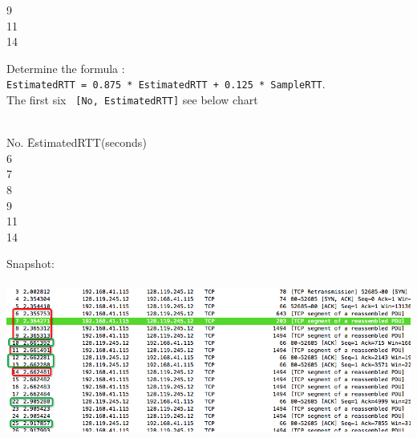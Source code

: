 \documentclass[a4paper]{article}
\begin{document}
{\begin{tabbing}
	 \hspace{4em}	9 	  \\
	 \hspace{4em}	11    \\
	 \hspace{4em}	14    \\
	\end{tabbing}
	Determine the formula :\\ \verb|EstimatedRTT = 0.875 * EstimatedRTT + 0.125 * SampleRTT|.\\The first six \verb| [No, EstimatedRTT]| see below chart\\\\
	\begin{tabbing}
	 \hspace{4em}	No.	\hspace{4mm} \= EstimatedRTT(seconds)\\
	 \hspace{4em}	6 \\
	 \hspace{4em}	7 \\
	 \hspace{4em}	8 \\
	 \hspace{4em}	9 \\
	 \hspace{4em}	11 \\
	 \hspace{4em}	14 \\
	\end{tabbing}
	Snapshot:\\\\
	{\centering\includegraphics[scale=0.5]{Illustrations/7_1.png}}\\\\
}
\end{document}
